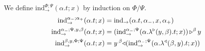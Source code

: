 \documentclass{llncs}
\begin{document}
\begin{definition}
  We define $\textrm{ind}_{\to}^{\Phi;\Psi}(\alpha.t; x)$ by induction
  on $\Phi/\Psi$.
  \begin{align*}
    \textrm{ind}_{\to}^{\alpha_-;\alpha_+}(\alpha.t; x) &= \punitelimkontZatABC{\alpha.t}{\alpha_-}{x}{\alpha_+}\\
    \textrm{ind}_{\to}^{\alpha_-;\Psi,y,\beta}(\alpha.t; x) &=
    \homrappXtoYatZ
        {(\textrm{ind}_{\to}^{\alpha_-;\Psi}(\alpha.\homrlambdaXatYdotZ y \beta t; x))} y \beta \\
    \textrm{ind}_{\to}^{\beta, y, \Phi;\Psi}(\alpha.t; x) &=
    \homlappXtoYatZ
        {(\textrm{ind}_{\to}^{\alpha_-;\Psi}(\alpha.\homllambdaXatYdotZ y \beta t; x))} y \beta \\
  \end{align*}
\end{definition}
\end{document}
